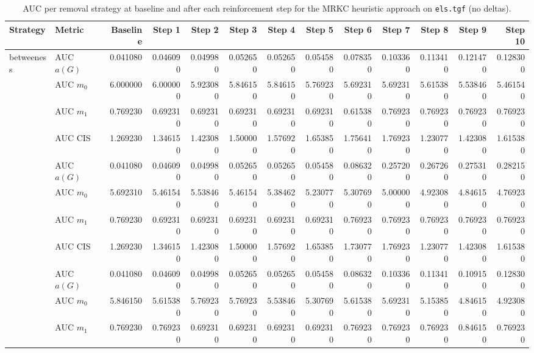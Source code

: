 \begin{table}[htbp]
  \centering
  \caption{AUC per removal strategy at baseline and after each reinforcement step for the MRKC heuristic approach on \texttt{els.tgf} (no deltas).}
  \label{tab:els-mrkc_heuristic-auc}
\setlength{\tabcolsep}{2.5pt}
  \begin{tabular}{llrrrrrrrrrrr}
    \toprule
    \textbf{Strategy} & \textbf{Metric} & \textbf{Baseline} & \textbf{Step 1} & \textbf{Step 2} & \textbf{Step 3} & \textbf{Step 4} & \textbf{Step 5} & \textbf{Step 6} & \textbf{Step 7} & \textbf{Step 8} & \textbf{Step 9} & \textbf{Step 10} \\
    \midrule
    \multirow{4}{*}{betweeness} & AUC $a(G)$ & 0.041080 & 0.046090 & 0.049980 & 0.052650 & 0.052650 & 0.054580 & 0.078350 & 0.103360 & 0.113410 & 0.121470 & 0.128300 \\
    & AUC $m_0$ & 6.000000 & 6.000000 & 5.923080 & 5.846150 & 5.846150 & 5.769230 & 5.692310 & 5.692310 & 5.615380 & 5.538460 & 5.461540 \\
    & AUC $m_1$ & 0.769230 & 0.692310 & 0.692310 & 0.692310 & 0.692310 & 0.692310 & 0.615380 & 0.769230 & 0.769230 & 0.769230 & 0.769230 \\
    & AUC CIS & 1.269230 & 1.346150 & 1.423080 & 1.500000 & 1.576920 & 1.653850 & 1.756410 & 1.769230 & 1.230770 & 1.423080 & 1.615380 \\
    \addlinespace
    \multirow{4}{*}{closeness} & AUC $a(G)$ & 0.041080 & 0.046090 & 0.049980 & 0.052650 & 0.052650 & 0.054580 & 0.086320 & 0.257200 & 0.267260 & 0.275310 & 0.282150 \\
    & AUC $m_0$ & 5.692310 & 5.461540 & 5.538460 & 5.461540 & 5.384620 & 5.230770 & 5.307690 & 5.000000 & 4.923080 & 4.846150 & 4.769230 \\
    & AUC $m_1$ & 0.769230 & 0.692310 & 0.692310 & 0.692310 & 0.692310 & 0.692310 & 0.769230 & 0.769230 & 0.769230 & 0.769230 & 0.769230 \\
    & AUC CIS & 1.269230 & 1.346150 & 1.423080 & 1.500000 & 1.576920 & 1.653850 & 1.730770 & 1.769230 & 1.230770 & 1.423080 & 1.615380 \\
    \addlinespace
    \multirow{4}{*}{core influence} & AUC $a(G)$ & 0.041080 & 0.046090 & 0.049980 & 0.052650 & 0.052650 & 0.054580 & 0.086320 & 0.103360 & 0.113410 & 0.109150 & 0.128300 \\
    & AUC $m_0$ & 5.846150 & 5.615380 & 5.769230 & 5.769230 & 5.538460 & 5.307690 & 5.615380 & 5.692310 & 5.153850 & 4.846150 & 4.923080 \\
    & AUC $m_1$ & 0.769230 & 0.769230 & 0.692310 & 0.692310 & 0.692310 & 0.692310 & 0.769230 & 0.769230 & 0.769230 & 0.846150 & 0.769230 \\

\end{tabular}
\end{table}
